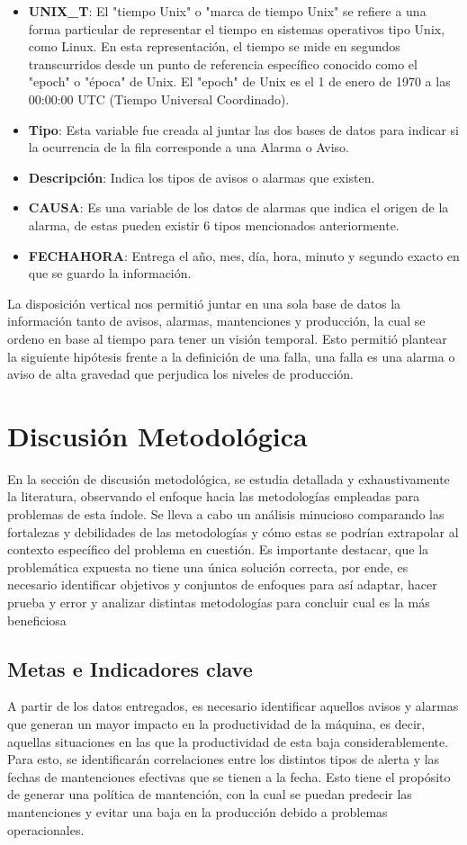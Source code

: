 \documentclass[10pt]{article}
\begin{document}
\begin{itemize}
\item \textbf{UNIX\_T}: El "tiempo Unix" o "marca de tiempo Unix" se refiere a una forma particular de representar el tiempo en sistemas operativos tipo Unix, como Linux. En esta representación, el tiempo se mide en segundos transcurridos desde un punto de referencia específico conocido como el "epoch" o "época" de Unix. El "epoch" de Unix es el 1 de enero de 1970 a las 00:00:00 UTC (Tiempo Universal Coordinado).
\item \textbf{Tipo}: Esta variable fue creada al juntar las dos bases de datos para indicar si la ocurrencia de la fila corresponde a una Alarma o Aviso.
\item \textbf{Descripción}: Indica los tipos de avisos o alarmas que existen.
\item \textbf{CAUSA}: Es una variable de los datos de alarmas que indica el origen de la alarma, de estas pueden existir 6 tipos mencionados anteriormente.
\item \textbf{FECHAHORA}: Entrega el año, mes, día, hora, minuto y segundo exacto en que se guardo la información.
\end{itemize}

La disposición vertical nos permitió juntar en una sola base de datos la información tanto de avisos, alarmas, mantenciones y producción, la cual se ordeno en base al tiempo para tener un visión temporal. Esto permitió plantear la siguiente hipótesis frente a la definición de una falla, una falla es una alarma o aviso de alta gravedad que perjudica los niveles de producción. 

\section{Discusión Metodológica}
En la sección de discusión metodológica, se estudia detallada y exhaustivamente la literatura, observando el enfoque hacia las metodologías empleadas para problemas de esta índole. Se lleva a cabo un análisis minucioso comparando las fortalezas y debilidades de las metodologías y cómo estas se podrían extrapolar al contexto específico del problema en cuestión. Es importante destacar, que la problemática expuesta no tiene una única solución correcta, por ende, es necesario identificar objetivos y conjuntos de enfoques para así adaptar, hacer prueba y error y analizar distintas metodologías para concluir cual es la más beneficiosa 

\subsection{Metas e Indicadores clave}
A partir de los datos entregados, es necesario identificar aquellos avisos y alarmas que generan un mayor impacto en la productividad de la máquina, es decir, aquellas situaciones en las que la productividad de esta baja considerablemente. Para esto, se identificarán correlaciones entre los distintos tipos de alerta y las fechas de mantenciones efectivas que se tienen a la fecha. Esto tiene el propósito de generar una política de mantención, con la cual se puedan predecir las mantenciones y evitar una baja en la producción debido a problemas operacionales.
\end{document}
